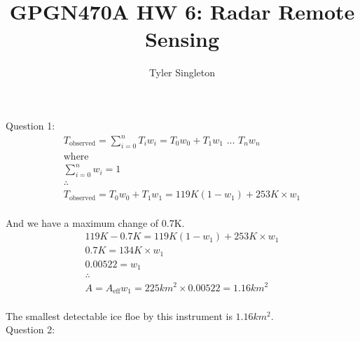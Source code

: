 \documentclass{homework}
\title{GPGN470A HW 6: Radar Remote Sensing}
\author{Tyler Singleton}
\begin{document}
\maketitle

Question 1: \\ 
\begin{gather*}
    T_{\text{observed}} = \sum\limits_{i=0}^n T_i w_i
    = T_0 w_0 + T_1 w_1 \text{ ... } T_n w_n \\ 
    \text{where} \nonumber \\ 
    \sum\limits_{i=0}^n w_i = 1 \\
    \therefore \nonumber \\
    T_{\text{observed}} = T_0 w_0 + T_1 w_1 = 119K (1-w_1) + 253K \times w_1 
\end{gather*} \\

And we have a maximum change of 0.7K.\\

\begin{gather*}
    119K - 0.7K = 119K (1-w_1) + 253K \times w_1\\
    0.7K = 134K \times w_1 \\
    0.00522 = w_1\\
    \therefore \\
    A = A_{\text{eff}} w_1 = 225km^2 \times 0.00522 = 1.16km^2
\end{gather*} \\

The smallest detectable ice floe by this instrument is $1.16km^2$. \\

Question 2: \\
\end{document}
